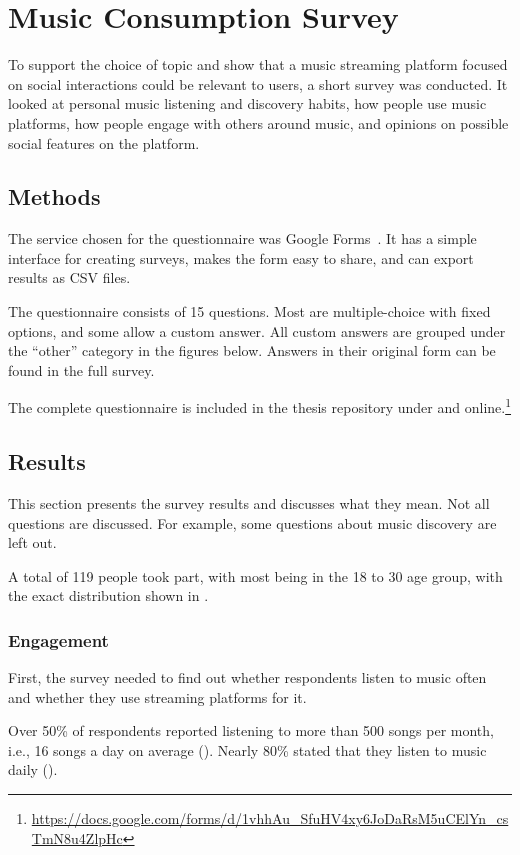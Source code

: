 \chapter{Music Consumption Survey}\label{ch:survey}

To support the choice of topic and show that a music streaming platform
focused on social interactions could be relevant to users, a short survey was conducted.
It looked at personal music listening and discovery habits, how people use music
platforms, how people engage with others around music, and opinions
on possible social features on the platform.


\section{Methods}
The service chosen for the questionnaire was Google Forms~\parencite{googleforms}.
It has a simple interface for creating surveys, makes the form easy to share,
and can export results as CSV files.

The questionnaire consists of 15 questions.
Most are multiple-choice with fixed options, and some allow a custom answer.
All custom answers are grouped under the ``other'' category in the figures below.
Answers in their original form can be found in the full survey.

The complete questionnaire is included in the thesis repository under
 and online.\footnote{\url{https://docs.google.com/forms/d/1vhhAu_SfuHV4xy6JoDaRsM5uCElYn_csTmN8u4ZlpHc}}


\section{Results}
This section presents the survey results and discusses what they mean.
Not all questions are discussed. For example, some questions about music discovery are left out.

A total of 119 people took part, with most being in the 18 to 30 age group,
with the exact distribution shown in .

\subsection{Engagement}
First, the survey needed to find out whether respondents listen
to music often and whether they use streaming platforms for it.

Over 50\% of respondents reported listening to more than 500 songs per month,
i.e., 16 songs a day on average
().
Nearly 80\% stated that they listen to music daily
().

